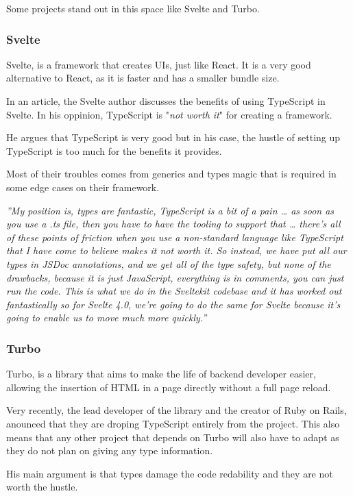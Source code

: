 \documentclass[10pt,journal,compsoc]{IEEEtran}
\begin{document}
Some projects stand out in this space like Svelte and Turbo.

\subsubsection{Svelte}

Svelte, is a framework that creates UIs, just like React. It is a very good alternative to React, as it is faster and has a smaller bundle size.

In an article, the Svelte author discusses the benefits of using TypeScript in Svelte. In his oppinion, TypeScript is "\textit{not worth it}" for creating a framework.

He argues that TypeScript is very good but in his case, the hustle of setting up TypeScript is too much for the benefits it provides.

Most of their troubles comes from generics and types magic that is required in some edge cases on their framework.

\textit{''My position is, types are fantastic, TypeScript is a bit of a pain … as soon as you use a .ts file, then you have to have the tooling to support that … there's all of these points of friction when you use a non-standard language like TypeScript that I have come to believe makes it not worth it. So instead, we have put all our types in JSDoc annotations, and we get all of the type safety, but none of the drawbacks, because it is just JavaScript, everything is in comments, you can just run the code. This is what we do in the Sveltekit codebase and it has worked out fantastically so for Svelte 4.0, we're going to do the same for Svelte because it's going to enable us to move much more quickly.''}

\subsubsection{Turbo}

Turbo, is a library that aims to make the life of backend developer easier, allowing the insertion of HTML in a page directly without a full page reload.

Very recently, the lead developer of the library and the creator of Ruby on Rails, anounced that they are droping TypeScript entirely from the project. This also means that any other project that depends on Turbo will also have to adapt as they do not plan on giving any type information.

His main argument is that types damage the code redability and they are not worth the hustle.
\end{document}
